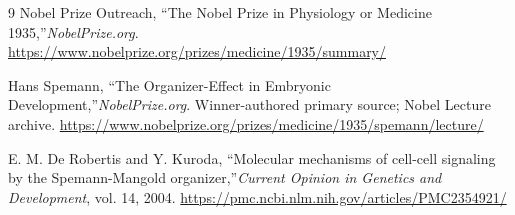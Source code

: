 \begin{thebibliography}{9}
Nobel Prize Outreach, ``The Nobel Prize in Physiology or Medicine 1935,''\emph{NobelPrize.org}.\newline
\url{https://www.nobelprize.org/prizes/medicine/1935/summary/}

Hans Spemann, ``The Organizer-Effect in Embryonic Development,''\emph{NobelPrize.org}. Winner-authored primary source; Nobel Lecture archive.\newline
\url{https://www.nobelprize.org/prizes/medicine/1935/spemann/lecture/}

E. M. De Robertis and Y. Kuroda, ``Molecular mechanisms of cell-cell signaling by the Spemann-Mangold organizer,''\emph{Current Opinion in Genetics and Development}, vol. 14, 2004.\newline
\url{https://pmc.ncbi.nlm.nih.gov/articles/PMC2354921/}
\end{thebibliography}
